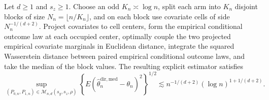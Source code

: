 Let \(d\ge1\) and \(s_z\ge1\). Choose an odd \(K_n\asymp\log n\), split each arm into \(K_n\) disjoint blocks of size \(N_n=\lfloor n/K_n\rfloor\), and on each block use covariate cells of side \(N_n^{-1/(d+2)}\). Project covariates to cell centers, form the empirical conditional outcome law at each occupied center, optimally couple the two projected empirical covariate marginals in Euclidean distance, integrate the squared Wasserstein distance between paired empirical conditional outcome laws, and take the median of the block values. The resulting explicit estimator satisfies
\[
\sup_{(P_{0,n},P_{1,n})\in\mathcal M_{n,d}(s_y,s_z,\rho)}
\left\{E(\widehat\theta_n^{\mathrm{dir,med}}-\theta_n)^2\right\}^{1/2}
\lesssim n^{-1/(d+2)}(\log n)^{1+1/(d+2)}.
\]